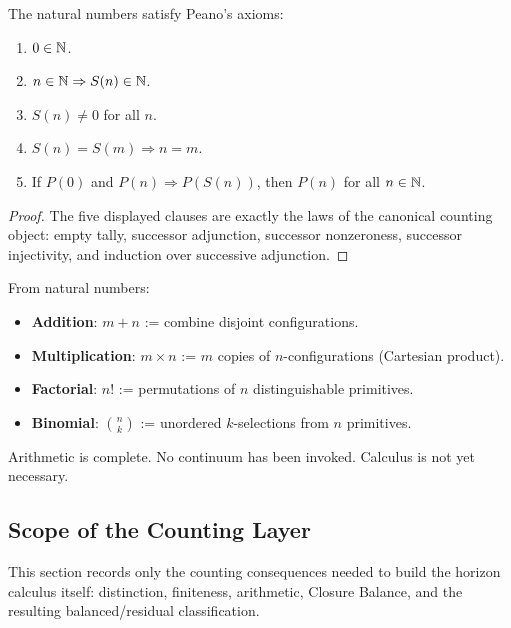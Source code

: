 \begin{theorem}\label{thm:peano}
The natural numbers satisfy Peano's axioms:
\begin{enumerate}[label=(P\arabic*), itemsep=0.2em]
\item $0 \in \mathbb{N}$.
\item $n \in \mathbb{N} \Rightarrow S(n) \in \mathbb{N}$.
\item $S(n) \neq 0$ for all $n$.
\item $S(n) = S(m) \Rightarrow n = m$.
\item If $P(0)$ and $P(n) \Rightarrow P(S(n))$, then $P(n)$ for all $n \in \mathbb{N}$.
\end{enumerate}
\end{theorem}

\begin{proof}
The five displayed clauses are exactly the laws of the canonical counting
object: empty tally, successor adjunction, successor nonzeroness, successor
injectivity, and induction over successive adjunction.
\end{proof}

\begin{definition}\label{def:arithmetic-ops}
From natural numbers:
\begin{itemize}[itemsep=0.2em]
\item \textbf{Addition}: $m + n$ := combine disjoint configurations.
\item \textbf{Multiplication}: $m \times n$ := $m$ copies of $n$-configurations (Cartesian product).
\item \textbf{Factorial}: $n!$ := permutations of $n$ distinguishable primitives.
\item \textbf{Binomial}: $\binom{n}{k}$ := unordered $k$-selections from $n$ primitives.
\end{itemize}
\end{definition}

Arithmetic is complete. No continuum has been invoked. Calculus is not yet necessary.


\subsection{Scope of the Counting Layer}
\label{subsec:emergent-algebra}

This section records only the counting consequences needed to build the
horizon calculus itself: distinction, finiteness, arithmetic, Closure
Balance, and the resulting balanced/residual classification.

